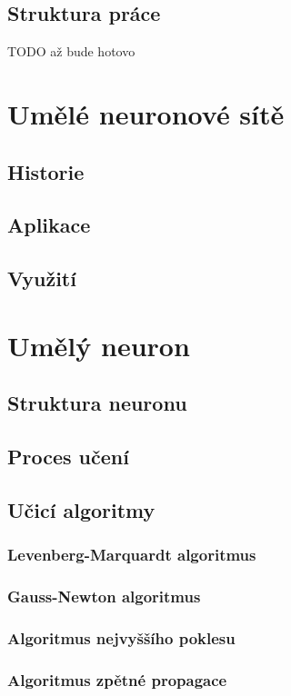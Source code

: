 \documentclass[11pt,twoside,a4paper]{book}
\begin{document}
\section{Struktura práce}
 TODO až bude hotovo

\chapter{Umělé neuronové sítě}
\section{Historie}
\section{Aplikace}
\section{Využití}
\chapter{Umělý neuron}
\section{Struktura neuronu}
\section{Proces učení}
\section{Učicí algoritmy}
\subsection{Levenberg-Marquardt algoritmus}
\subsection{Gauss-Newton algoritmus}
\subsection{Algoritmus nejvyššího poklesu}
\subsection{Algoritmus zpětné propagace}
\end{document}

